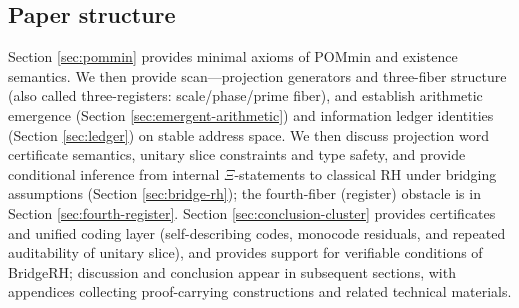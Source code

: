 \subsection{Paper structure}
Section \ref{sec:pommin} provides minimal axioms of POMmin and existence semantics. We then provide scan—projection generators and three-fiber structure (also called three-registers: scale/phase/prime fiber), and establish arithmetic emergence (Section \ref{sec:emergent-arithmetic}) and information ledger identities (Section \ref{sec:ledger}) on stable address space. We then discuss projection word certificate semantics, unitary slice constraints and type safety, and provide conditional inference from internal $\Xi$-statements to classical RH under bridging assumptions (Section \ref{sec:bridge-rh}); the fourth-fiber (register) obstacle is in Section \ref{sec:fourth-register}. Section \ref{sec:conclusion-cluster} provides certificates and unified coding layer (self-describing codes, monocode residuals, and repeated auditability of unitary slice), and provides support for verifiable conditions of BridgeRH; discussion and conclusion appear in subsequent sections, with appendices collecting proof-carrying constructions and related technical materials.\par
